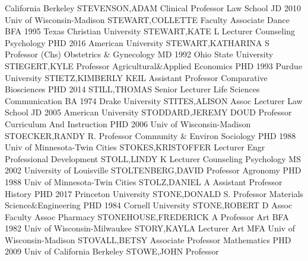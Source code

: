\documentclass[
]{article}
\begin{document}
California Berkeley \textbar STEVENSON,ADAM \textbar Clinical Professor
\textbar{}  \textbar Law School \textbar JD 2010 Univ of
Wisconsin-Madison \textbar STEWART,COLLETTE \textbar Faculty Associate
\textbar{}  \textbar Dance \textbar BFA 1995 Texas Christian
University \textbar STEWART,KATE L \textbar Lecturer \textbar{}
 \textbar Counseling Psychology \textbar PHD 2016 American
University \textbar STEWART,KATHARINA S \textbar Professor (Chs)
\textbar{}  \textbar Obstetrics \& Gynecology \textbar MD
1992 Ohio State University \textbar STIEGERT,KYLE \textbar Professor
\textbar{}  \textbar Agricultural\&Applied Economics
\textbar PHD 1993 Purdue University \textbar STIETZ,KIMBERLY KEIL
\textbar Assistant Professor \textbar{} 
\textbar Comparative Biosciences \textbar PHD 2014 \textbar STILL,THOMAS
\textbar Senior Lecturer \textbar{}  \textbar Life Sciences
Communication \textbar BA 1974 Drake University \textbar STITES,ALISON
\textbar Assoc Lecturer \textbar{}  \textbar Law School
\textbar JD 2005 American University \textbar STODDARD,JEREMY DOUD
\textbar Professor \textbar{}  \textbar Curriculum And
Instruction \textbar PHD 2006 Univ of Wisconsin-Madison
\textbar STOECKER,RANDY R. \textbar Professor \textbar{} 
\textbar Community \& Environ Sociology \textbar PHD 1988 Univ of
Minnesota-Twin Cities \textbar STOKES,KRISTOFFER \textbar Lecturer
\textbar{}  \textbar Engr Professional Development
\textbar STOLL,LINDY K \textbar Lecturer \textbar Counseling Psychology
\textbar{}  \textbar MS 2002 University of Louisville
\textbar STOLTENBERG,DAVID \textbar Professor \textbar Agronomy
\textbar{}  \textbar PHD 1988 Univ of Minnesota-Twin Cities
\textbar STOLZ,DANIEL A \textbar Assistant Professor \textbar History
\textbar{}  \textbar PHD 2017 Princeton University
\textbar STONE,DONALD S. \textbar Professor \textbar Materials
Science\&Engineering \textbar{}  \textbar PHD 1984 Cornell
University \textbar STONE,ROBERT D \textbar Assoc Faculty Assoc
\textbar Pharmacy \textbar{}  \textbar STONEHOUSE,FREDERICK
A \textbar Professor \textbar Art \textbar BFA 1982 Univ of
Wisconsin-Milwaukee \textbar{}  \textbar STORY,KAYLA
\textbar Lecturer \textbar Art \textbar MFA Univ of Wisconsin-Madison
\textbar{}  \textbar STOVALL,BETSY \textbar Associate
Professor \textbar Mathematics \textbar PHD 2009 Univ of California
Berkeley \textbar{}  \textbar STOWE,JOHN \textbar Professor
\end{document}
